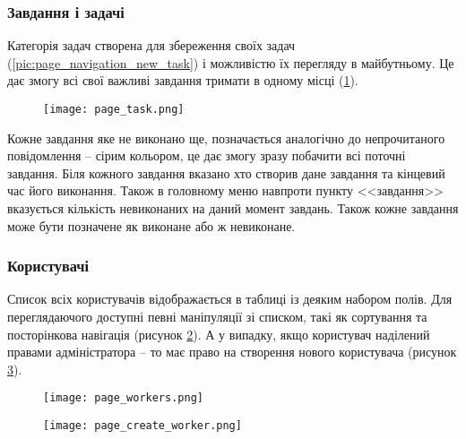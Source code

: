 \subsubsection{Завдання і задачі}
\par Категорія задач створена для збереження своїх задач (\ref{pic:page_navigation_new_task}) і можливістю їх перегляду в майбутньому. Це дає змогу всі свої важливі завдання тримати в одному місці (\ref{pic:page_task}).
  \begin{figure}[!ht]
  \centering
      \texttt{[image: page\_task.png]}
      \label{pic:page_task}
  \end{figure}
\par Кожне завдання яке не виконано ще, позначається аналогічно до непрочитаного повідомлення -- сірим кольором, це дає змогу зразу побачити всі поточні завдання. Біля кожного завдання вказано хто створив дане завдання та кінцевий час його виконання. Також в головному меню навпроти пункту <<завдання>> вказується кількість невиконаних на даний момент завдань. Також кожне завдання може бути позначене як виконане або ж невиконане.

\subsubsection{Користувачі}
\par Список всіх користувачів відображається в таблиці із деяким набором полів. Для переглядаючого доступні певні маніпуляції зі списком, такі як сортування та посторінкова навігація (рисунок \ref{pic:page_workers}). А у випадку, якщо користувач наділений правами адміністратора -- то має право на створення нового користувача (рисунок \ref{pic:page_create_worker}).

  \begin{figure}[!ht]
  \centering
      \texttt{[image: page\_workers.png]}
      \label{pic:page_workers}
  \end{figure}

  \begin{figure}[!ht]
  \centering
      \texttt{[image: page\_create\_worker.png]}
      \label{pic:page_create_worker}
  \end{figure}

